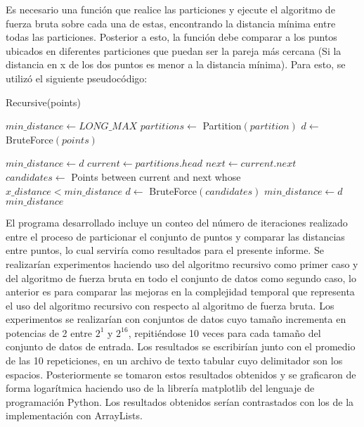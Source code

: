 Es necesario una función que realice las particiones y ejecute el algoritmo de fuerza bruta sobre cada una de estas, encontrando la distancia mínima entre todas las particiones. Posterior a esto, la función debe comparar a los puntos ubicados en diferentes particiones que puedan ser la pareja más cercana (Si la distancia en x de los dos puntos es menor a la distancia mínima). Para esto, se utilizó el siguiente pseudocódigo:

\begin{algorithm}[H]	%
	\caption{Recursive(points)}	%
	\begin{algorithmic}
	    \STATE $min\_distance \gets LONG\_MAX$
	    \STATE $partitions \gets$ Partition$(partition)$
	        \STATE $d \gets$ BruteForce$(points)$
	        
	            \STATE $min\_distance \gets d$
	        \ENDIF
	    \ENDFOR
	    \STATE $current \gets partitions.head$
	        \STATE $next \gets current.next$
	        \STATE $candidates \gets$ Points between current and next whose $x\_distance < min\_distance$
	        \STATE $d \gets$ BruteForce$(candidates)$
	            \STATE $min\_distance \gets d$
	        \ENDIF
	    \ENDWHILE
    \RETURN $min\_distance$
	\end{algorithmic}
	\label{algo:factorial}	%
\end{algorithm}

El programa desarrollado incluye un conteo del número de iteraciones realizado entre el proceso de particionar el conjunto de puntos y comparar las distancias entre puntos, lo cual serviría como resultados para el presente informe. Se realizarían experimentos haciendo uso del algoritmo recursivo como primer caso y del algoritmo de fuerza bruta en todo el conjunto de datos como segundo caso, lo anterior es para comparar las mejoras en la complejidad temporal que representa el uso del algoritmo recursivo con respecto al algoritmo de fuerza bruta. Los experimentos se realizarían con conjuntos de datos cuyo tamaño incrementa en potencias de 2 entre $2^1$ y $2^16$, repitiéndose 10 veces para cada tamaño del conjunto de datos de entrada. Los resultados se escribirían junto con el promedio de las 10 repeticiones, en un archivo de texto tabular cuyo delimitador son los espacios. Posteriormente se tomaron estos resultados obtenidos y se graficaron de forma logarítmica haciendo uso de la librería matplotlib del lenguaje de programación Python. Los resultados obtenidos serían contrastados con los de la implementación con ArrayLists.